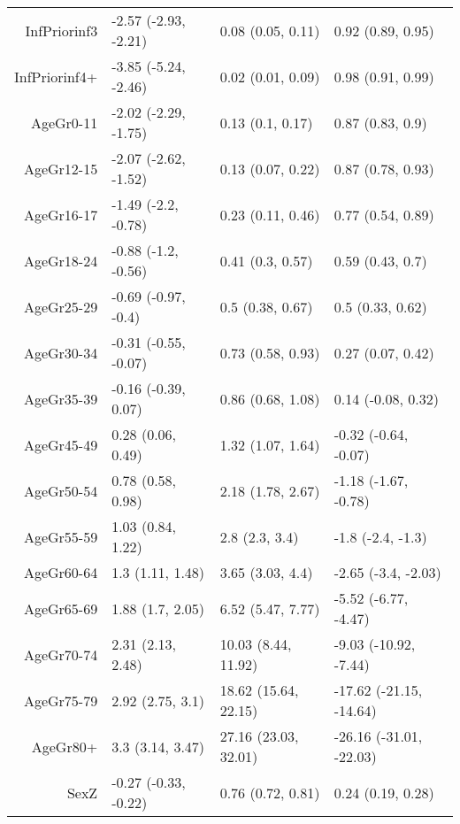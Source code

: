 \begin{table}[ht]
\begin{tabular}{rlll}
  InfPriorinf3 & -2.57 (-2.93, -2.21) & 0.08 (0.05, 0.11) & 0.92 (0.89, 0.95) \\ 
  InfPriorinf4+ & -3.85 (-5.24, -2.46) & 0.02 (0.01, 0.09) & 0.98 (0.91, 0.99) \\ 
  AgeGr0-11 & -2.02 (-2.29, -1.75) & 0.13 (0.1, 0.17) & 0.87 (0.83, 0.9) \\ 
  AgeGr12-15 & -2.07 (-2.62, -1.52) & 0.13 (0.07, 0.22) & 0.87 (0.78, 0.93) \\ 
  AgeGr16-17 & -1.49 (-2.2, -0.78) & 0.23 (0.11, 0.46) & 0.77 (0.54, 0.89) \\ 
  AgeGr18-24 & -0.88 (-1.2, -0.56) & 0.41 (0.3, 0.57) & 0.59 (0.43, 0.7) \\ 
  AgeGr25-29 & -0.69 (-0.97, -0.4) & 0.5 (0.38, 0.67) & 0.5 (0.33, 0.62) \\ 
  AgeGr30-34 & -0.31 (-0.55, -0.07) & 0.73 (0.58, 0.93) & 0.27 (0.07, 0.42) \\ 
  AgeGr35-39 & -0.16 (-0.39, 0.07) & 0.86 (0.68, 1.08) & 0.14 (-0.08, 0.32) \\ 
  AgeGr45-49 & 0.28 (0.06, 0.49) & 1.32 (1.07, 1.64) & -0.32 (-0.64, -0.07) \\ 
  AgeGr50-54 & 0.78 (0.58, 0.98) & 2.18 (1.78, 2.67) & -1.18 (-1.67, -0.78) \\ 
  AgeGr55-59 & 1.03 (0.84, 1.22) & 2.8 (2.3, 3.4) & -1.8 (-2.4, -1.3) \\ 
  AgeGr60-64 & 1.3 (1.11, 1.48) & 3.65 (3.03, 4.4) & -2.65 (-3.4, -2.03) \\ 
  AgeGr65-69 & 1.88 (1.7, 2.05) & 6.52 (5.47, 7.77) & -5.52 (-6.77, -4.47) \\ 
  AgeGr70-74 & 2.31 (2.13, 2.48) & 10.03 (8.44, 11.92) & -9.03 (-10.92, -7.44) \\ 
  AgeGr75-79 & 2.92 (2.75, 3.1) & 18.62 (15.64, 22.15) & -17.62 (-21.15, -14.64) \\ 
  AgeGr80+ & 3.3 (3.14, 3.47) & 27.16 (23.03, 32.01) & -26.16 (-31.01, -22.03) \\ 
  SexZ & -0.27 (-0.33, -0.22) & 0.76 (0.72, 0.81) & 0.24 (0.19, 0.28) \\ 
   \hline
\end{tabular}
\end{table}
